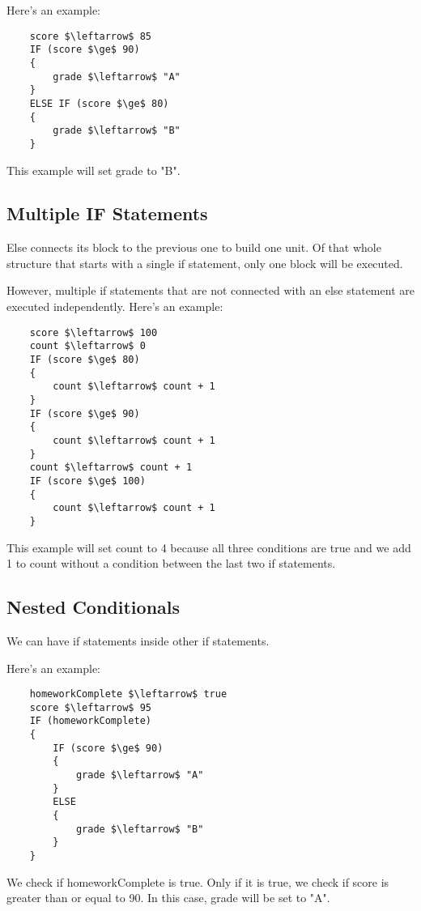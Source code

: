 \documentclass{article}
\begin{document}
Here's an example:
\begin{lstlisting}
    score $\leftarrow$ 85
    IF (score $\ge$ 90)
    {
        grade $\leftarrow$ "A"
    }
    ELSE IF (score $\ge$ 80)
    {
        grade $\leftarrow$ "B"
    }
\end{lstlisting}

This example will set grade to "B".


\subsection{Multiple IF Statements}

Else connects its block to the previous one to build one unit. Of that whole structure that starts with a single if statement, only one block will be executed.

However, multiple if statements that are not connected with an else statement are executed independently. 
Here's an example:
\begin{lstlisting}
    score $\leftarrow$ 100
    count $\leftarrow$ 0
    IF (score $\ge$ 80)
    {
        count $\leftarrow$ count + 1
    }
    IF (score $\ge$ 90)
    {
        count $\leftarrow$ count + 1
    }
    count $\leftarrow$ count + 1
    IF (score $\ge$ 100)
    {
        count $\leftarrow$ count + 1
    }
\end{lstlisting}

This example will set count to 4 because all three conditions are true and we add 1 to count without a condition between the last two if statements.

\subsection*{Nested Conditionals}

We can have if statements inside other if statements.

Here's an example:
\begin{lstlisting}
    homeworkComplete $\leftarrow$ true
    score $\leftarrow$ 95
    IF (homeworkComplete)
    {
        IF (score $\ge$ 90)
        {
            grade $\leftarrow$ "A"
        }
        ELSE
        {
            grade $\leftarrow$ "B"
        }
    }
\end{lstlisting}
We check if homeworkComplete is true. Only if it is true, we check if score is greater than or equal to 90. In this case, grade will be set to "A".
\end{document}
